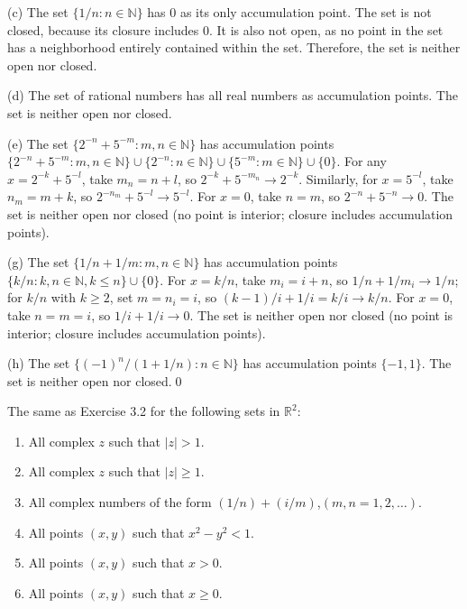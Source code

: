 (c) The set $\{1/n : n \in \mathbb{N}\}$ has 0 as its only accumulation point. The set is not closed, because its closure includes 0. It is also not open, as no point in the set has a neighborhood entirely contained within the set. Therefore, the set is neither open nor closed.


(d) The set of rational numbers has all real numbers as accumulation points. The set is neither open nor closed.

(e) The set $\{2^{-n} + 5^{-m} : m,n \in \mathbb{N}\}$ has accumulation points $\{2^{-n} + 5^{-m} : m,n \in \mathbb{N}\} \cup \{2^{-n} : n \in \mathbb{N}\} \cup \{5^{-m} : m \in \mathbb{N}\} \cup \{0\}$. For any $x = 2^{-k} + 5^{-l}$, take $m_n = n + l$, so $2^{-k} + 5^{-m_n} \to 2^{-k}$. Similarly, for $x = 5^{-l}$, take $n_m = m + k$, so $2^{-n_m} + 5^{-l} \to 5^{-l}$. For $x = 0$, take $n = m$, so $2^{-n} + 5^{-n} \to 0$. The set is neither open nor closed (no point is interior; closure includes accumulation points).

(g) The set $\{1/n + 1/m : m,n \in \mathbb{N}\}$ has accumulation points $\{k/n : k,n \in \mathbb{N}, k \leq n\} \cup \{0\}$. For $x = k/n$, take $m_i = i + n$, so $1/n + 1/m_i \to 1/n$; for $k/n$ with $k \geq 2$, set $m = n_i = i$, so $(k-1)/i + 1/i = k/i \to k/n$. For $x = 0$, take $n = m = i$, so $1/i + 1/i \to 0$. The set is neither open nor closed (no point is interior; closure includes accumulation points).

(h) The set $\{(-1)^n/(1+1/n) : n \in \mathbb{N}\}$ has accumulation points $\{-1, 1\}$. The set is neither open nor closed.\qed


\begin{problembox}
\begin{problemstatement}
The same as Exercise 3.2 for the following sets in $\mathbb{R}^2$:
\begin{enumerate}[label=\textbf{(\alph*)}]
\item All complex $z$ such that $|z| > 1$.
\item All complex $z$ such that $|z| \ge 1$.
\item All complex numbers of the form $(1/n) + (i/m)$,\quad $(m, n = 1, 2, \dots)$.
\item All points $(x, y)$ such that $x^2 - y^2 < 1$.
\item All points $(x, y)$ such that $x > 0$.
\item All points $(x, y)$ such that $x \ge 0$.
\end{enumerate}
\end{problemstatement}
\end{problembox}

